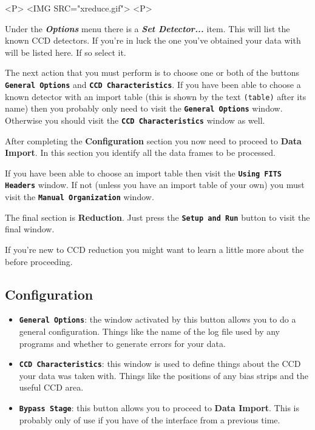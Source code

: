 \documentclass[11pt,nolof]{starlink}
\providecommand{\butt}[1]{{\bf \tt #1}}
\providecommand{\menu}[1]{{\bf \em #1}}
\providecommand{\wlab}[1]{{\bf #1}}
\providecommand{\text}[1]{{\tt #1}}
\begin{document}
\begin{html}
<P>
<IMG SRC="xreduce.gif">
<P>
\end{html}

Under the \menu{Options} menu there is a \menu{Set Detector...}
item. This will list the known CCD detectors. If you're in luck the
one you've obtained your data with will be listed here. If so select it.

The next action that you must perform is to choose one or both of the
buttons \butt{General Options} and \butt{CCD Characteristics}. If you
have been able to choose a known detector with an import table (this
is shown by the text \text{(table)} after its name) then you probably
only need to visit the \butt{General Options} window. Otherwise you
should visit the \butt{CCD Characteristics} window as well.

After completing the \wlab{Configuration} section you now need to
proceed to \wlab{Data Import}. In this section you identify all the
data frames to be processed.

If you have been able to choose an import table then visit the
\butt{Using FITS Headers} window. If not (unless you have an import
table of your own) you must visit the \butt{Manual Organization}
window.

The final section is \wlab{Reduction}. Just press the \butt{Setup and
Run} button to visit the final window.

If you're new to CCD reduction you might want to learn a little more
about the  before
proceeding.

\subsection{Configuration }
\begin{itemize}
\item \butt{General Options}: the window activated by this button
allows you to do a general configuration. Things like the name of the
log file used by any programs and whether to generate errors for your
data.
\item \butt{CCD Characteristics}: this window is used to define things
about the CCD your data was taken with. Things like the positions of
any bias strips and the useful CCD area.
\item \butt{Bypass Stage}: this button allows you to proceed to
\wlab{Data Import}. This is probably only of use if you have
 of the interface from a previous time.
\end{itemize}
\end{document}
